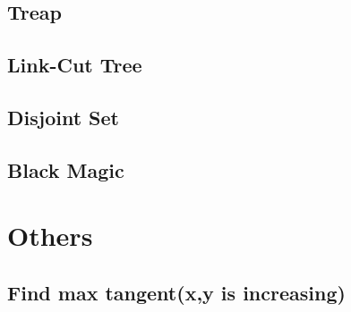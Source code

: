 \documentclass[10pt,twocolumn,oneside]{article}
\begin{document}
\subsection{Treap}


\subsection{Link-Cut Tree}


\newpage

\subsection{Disjoint Set}


\subsection{Black Magic}


\section{Others}

\subsection{Find max tangent(x,y is increasing)}


% 
\end{document}
